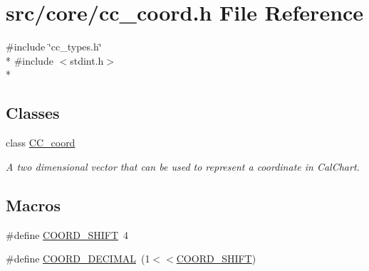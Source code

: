\hypertarget{a00204}{\section{src/core/cc\-\_\-coord.h File Reference}
\label{a00204}
}
{\ttfamily \#include \char`\"{}cc\-\_\-types.\-h\char`\"{}}\\*
{\ttfamily \#include $<$stdint.\-h$>$}\\*
\subsection*{Classes}
\begin{DoxyCompactItemize}
\item 
class \hyperlink{a00029}{C\-C\-\_\-coord}
\begin{DoxyCompactList}\small\item\em A two dimensional vector that can be used to represent a coordinate in Cal\-Chart. \end{DoxyCompactList}\end{DoxyCompactItemize}
\subsection*{Macros}
\begin{DoxyCompactItemize}
\item 
\#define \hyperlink{a00204_a89a0ee45e3c08aa1a91983e887504e6a}{C\-O\-O\-R\-D\-\_\-\-S\-H\-I\-F\-T}~4
\item 
\#define \hyperlink{a00204_a3936069d2674cf5df63477c89b7fbbf1}{C\-O\-O\-R\-D\-\_\-\-D\-E\-C\-I\-M\-A\-L}~(1$<$$<$\hyperlink{a00204_a89a0ee45e3c08aa1a91983e887504e6a}{C\-O\-O\-R\-D\-\_\-\-S\-H\-I\-F\-T})
\end{DoxyCompactItemize}
